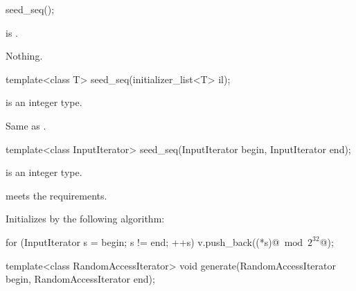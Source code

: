 %
\begin{itemdecl}
seed_seq();
\end{itemdecl}

\begin{itemdescr}
\pnum
\ensures
{} is .

\pnum
\throws
Nothing.
\end{itemdescr}


%
\begin{itemdecl}
template<class T>
 seed_seq(initializer_list<T> il);
\end{itemdecl}

\begin{itemdescr}
\pnum
\mandates
{} is an integer type.

\pnum
\effects
 Same as .
\end{itemdescr}


%
\begin{itemdecl}
template<class InputIterator>
  seed_seq(InputIterator begin, InputIterator end);
\end{itemdecl}

\begin{itemdescr}
\pnum
\mandates
  is an integer type.

\pnum
\expects
   meets the
   requirements.

\pnum
\effects
Initializes 
by the following algorithm:
\begin{codeblock}
for (InputIterator s = begin; s != end; ++s)
 v.push_back((*s)@$\bmod 2^{32}$@);
\end{codeblock}%
\end{itemdescr}

%
\begin{itemdecl}
template<class RandomAccessIterator>
  void generate(RandomAccessIterator begin, RandomAccessIterator end);
\end{itemdecl}

